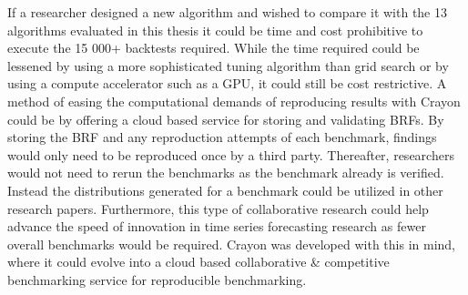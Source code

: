 If a researcher designed a new algorithm and wished to compare it with the 13 algorithms evaluated in this thesis it could be time and cost prohibitive to execute the 15 000+ backtests required. While the time required could be lessened by using a more sophisticated tuning algorithm than grid search or by using a compute accelerator such as a GPU, it could still be cost restrictive. A method of easing the computational demands of reproducing results with Crayon could be by offering a cloud based service for storing and validating BRFs. By storing the BRF and any reproduction attempts of each benchmark, findings would only need to be reproduced once by a third party. Thereafter, researchers would not need to rerun the benchmarks as the benchmark already is verified. Instead the distributions generated for a benchmark could be utilized in other research papers. Furthermore, this type of collaborative research could help advance the speed of innovation in time series forecasting research as fewer overall benchmarks would be required. Crayon was developed with this in mind, where it could evolve into a cloud based collaborative \& competitive benchmarking service for reproducible benchmarking.